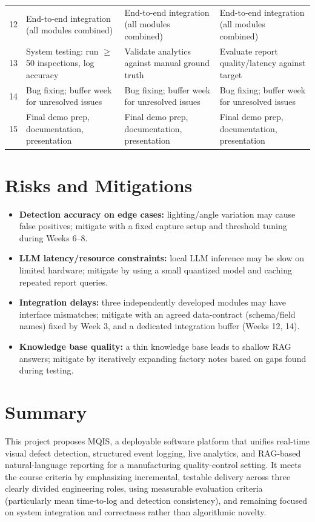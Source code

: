 \documentclass[11pt]{article}
\begin{document}
\begin{longtable}{@{}p{1.6cm}p{4.3cm}p{4.3cm}p{4.3cm}@{}}
12 & End-to-end integration (all modules combined) & End-to-end integration (all modules combined) & End-to-end integration (all modules combined) \\
13 & System testing: run $\geq$50 inspections, log accuracy & Validate analytics against manual ground truth & Evaluate report quality/latency against target \\
14 & Bug fixing; buffer week for unresolved issues & Bug fixing; buffer week for unresolved issues & Bug fixing; buffer week for unresolved issues \\
15 & Final demo prep, documentation, presentation & Final demo prep, documentation, presentation & Final demo prep, documentation, presentation \\
\bottomrule
\end{longtable}

\section{Risks and Mitigations}
\begin{itemize}[leftmargin=*]
    \item \textbf{Detection accuracy on edge cases:} lighting/angle variation may cause false
    positives; mitigate with a fixed capture setup and threshold tuning during Weeks 6--8.
    \item \textbf{LLM latency/resource constraints:} local LLM inference may be slow on limited
    hardware; mitigate by using a small quantized model and caching repeated report queries.
    \item \textbf{Integration delays:} three independently developed modules may have interface
    mismatches; mitigate with an agreed data-contract (schema/field names) fixed by Week 3, and a
    dedicated integration buffer (Weeks 12, 14).
    \item \textbf{Knowledge base quality:} a thin knowledge base leads to shallow RAG answers;
    mitigate by iteratively expanding factory notes based on gaps found during testing.
\end{itemize}

\section{Summary}
This project proposes MQIS, a deployable software platform that unifies real-time visual defect
detection, structured event logging, live analytics, and RAG-based natural-language reporting for
a manufacturing quality-control setting. It meets the course criteria by emphasizing incremental,
testable delivery across three clearly divided engineering roles, using measurable evaluation
criteria (particularly mean time-to-log and detection consistency), and remaining focused on
system integration and correctness rather than algorithmic novelty.
\end{document}
